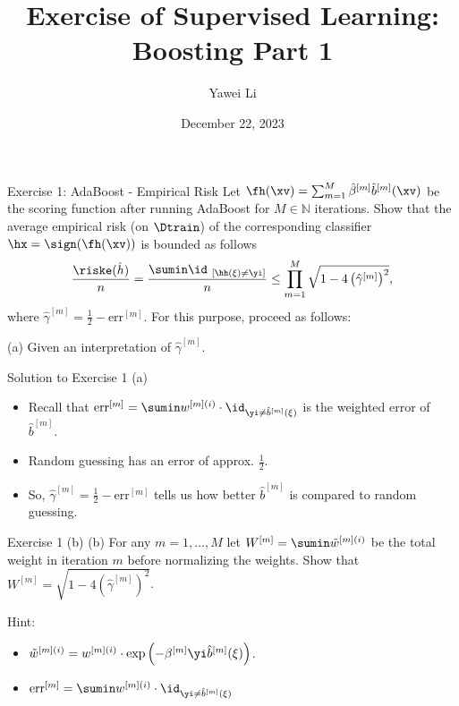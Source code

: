 \documentclass[aspectratio=169]{beamer}
\title[]{\textbf{Exercise of Supervised Learning: \\ Boosting Part 1}}
\author{Yawei Li}
\institute[LMU]
{
\\
  \texttt{yawei.li@stat.uni-muenchen.de}
}
\date{December 22, 2023}
\newcommand{\betahm}{\hat{\beta}^{[m]}}
\newcommand{\bhm}{\hat{b}^{[m]}}
\newcommand{\gammahm}{\hat{\gamma}^{[m]}}
\newcommand{\idhxneqy}{\id_{\ [\hh\left(\xi\right) \neq \yi]}}
\newcommand{\errm}{\mathrm{err}^{[m]}}
\newcommand{\summM}{\sum_{m=1}^M}
\newcommand{\prodmM}{\prod_{m=1}^M}
\newcommand{\Wm}{W^{[m]}}
\newcommand{\wmi}{w^{[m] (i)}}
\newcommand{\wtmi}{\tilde{w}^{[m](i)}}
\newcommand{\betam}{\beta^{[m]}}
\begin{document}
\begin{frame}
\titlepage

\end{frame}



\begin{frame}{Exercise 1: AdaBoost - Empirical Risk}
	Let $\fh(\xv) = \summM \betahm \bhm (\xv) $ be the scoring function after running AdaBoost for $M \in \mathbb{N}$ iterations. Show that the average empirical risk (on $\Dtrain$) of the corresponding classifier $\hx = \sign (\fh(\xv))$ is bounded as follows
	\begin{align}
		\frac{\riske (\hat{h})}{n} = \frac{\sumin \idhxneqy}{n} \leq \prodmM \sqrt{1 - 4 \left(\gammahm\right)^2},
	\end{align}
	where $\gammahm = \frac{1}{2} - \errm$. For this purpose, proceed as follows:
	
	(a) Given an interpretation of $\gammahm$.
\end{frame}

\begin{frame}{Solution to Exercise 1 (a)}
	\begin{itemize}
		\item Recall that $\errm = \sumin \wmi \cdot \id_{\yi \neq \bhm(\xi)}$ is the weighted error of $\bhm$.
		\item Random guessing has an error of approx. $\frac{1}{2}$.
		\item So, $\gammahm = \frac{1}{2} - \errm$ tells us how better $\bhm$ is compared to random guessing.
	\end{itemize}
	
\end{frame}

\begin{frame}{Exercise 1 (b)}
	(b) For any $m = 1, \ldots, M$ let $\Wm = \sumin \wtmi$ be the total weight in iteration $m$ before normalizing the weights. Show that $\Wm = \sqrt{1 - 4\left(\gammahm \right)^2}$.
	
	Hint:
	\begin{itemize}
		\item $\wtmi = \wmi \cdot \exp \left( - \betam \yi \bhm(\xi) \right)$.
		\item $\errm = \sumin \wmi \cdot \id_{\yi \neq \bhm(\xi)}$
	\end{itemize}
\end{frame}
\end{document}
